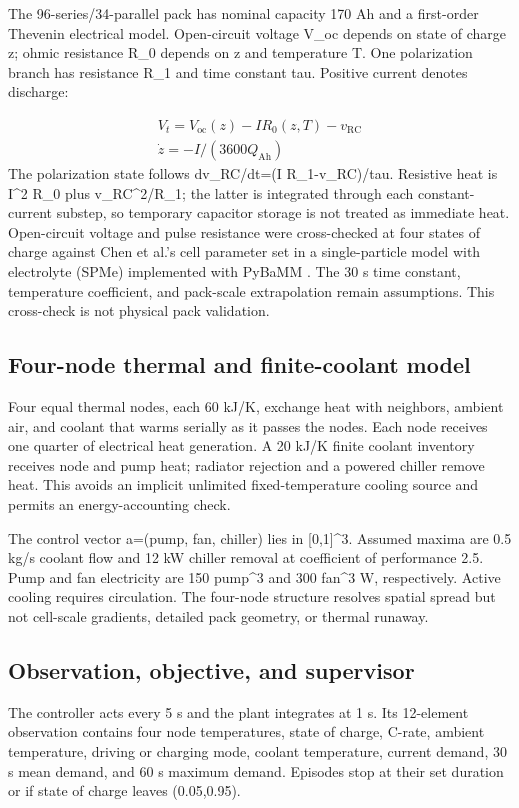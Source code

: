 \documentclass[conference]{IEEEtran}
\begin{document}
The 96-series/34-parallel pack has nominal capacity 170 Ah and a first-order Thevenin electrical model. Open-circuit voltage V\_oc depends on state of charge z; ohmic resistance R\_0 depends on z and temperature T. One polarization branch has resistance R\_1 and time constant tau. Positive current denotes discharge:

\begin{equation}
\begin{gathered}V_t=V_{\mathrm{oc}}(z)-IR_0(z,T)-v_{\mathrm{RC}}\\\dot z=-I/(3600Q_{\mathrm{Ah}})\end{gathered}
\label{eq:2}
\end{equation}
The polarization state follows dv\_RC/dt=(I R\_1-v\_RC)/tau. Resistive heat is I\textasciicircum{}2 R\_0 plus v\_RC\textasciicircum{}2/R\_1; the latter is integrated through each constant-current substep, so temporary capacitor storage is not treated as immediate heat. Open-circuit voltage and pulse resistance were cross-checked at four states of charge against Chen et al.'s cell parameter set \cite{r11} in a single-particle model with electrolyte (SPMe) \cite{r12} implemented with PyBaMM \cite{r13}. The 30 s time constant, temperature coefficient, and pack-scale extrapolation remain assumptions. This cross-check is not physical pack validation.

\subsection{Four-node thermal and finite-coolant model}
Four equal thermal nodes, each 60 kJ/K, exchange heat with neighbors, ambient air, and coolant that warms serially as it passes the nodes. Each node receives one quarter of electrical heat generation. A 20 kJ/K finite coolant inventory receives node and pump heat; radiator rejection and a powered chiller remove heat. This avoids an implicit unlimited fixed-temperature cooling source and permits an energy-accounting check.

The control vector a=(pump, fan, chiller) lies in [0,1]\textasciicircum{}3. Assumed maxima are 0.5 kg/s coolant flow and 12 kW chiller removal at coefficient of performance 2.5. Pump and fan electricity are 150 pump\textasciicircum{}3 and 300 fan\textasciicircum{}3 W, respectively. Active cooling requires circulation. The four-node structure resolves spatial spread but not cell-scale gradients, detailed pack geometry, or thermal runaway.

\subsection{Observation, objective, and supervisor}
The controller acts every 5 s and the plant integrates at 1 s. Its 12-element observation contains four node temperatures, state of charge, C-rate, ambient temperature, driving or charging mode, coolant temperature, current demand, 30 s mean demand, and 60 s maximum demand. Episodes stop at their set duration or if state of charge leaves (0.05,0.95).
\end{document}
